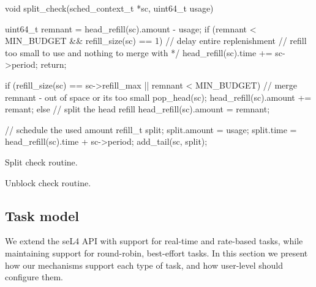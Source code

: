 \begin{listing}
    \begin{ccode}
void split_check(sched_context_t *sc, uint64_t usage) {
  uint64_t remnant = head_refill(sc).amount - usage;
  if (remnant < MIN_BUDGET && refill_size(sc) == 1) {
    // delay entire replenishment
    // refill too small to use and nothing to merge with */
    head_refill(sc).time += sc->period;
    return;
  }

  if (refill_size(sc) == sc->refill_max || remnant < MIN_BUDGET) {
    // merge remnant - out of space or its too small
    pop_head(sc);
    head_refill(sc).amount += remant;
  } else {
    // split the head refill
    head_refill(sc).amount = remnant;
  }

  // schedule the used amount
  refill_t split;
  split.amount = usage;
  split.time = head_refill(sc).time + sc->period;
  add_tail(sc, split);
}
\end{ccode}
\caption{Split check routine.}
\label{list:split-check}
\end{listing}

\begin{listing}
    \begin{ccode}
void unblock_check(sched_context_t *sc) {
  if (!head_refill(sc).time > now)) {
    return;
  }

  head_refill(sc).time = now;
  // merge available replenishments
  while (refill_size(sc) > 1) {
    if (refill_next(sc).time < now + head_refill(sc).amount) {
      refill_t old_head = pop_head(sc);
      head_refill(sc).amount += old_head.amount;
      head_refill(sc).time = now;
    } else {
      break;
    }

    if (head_refill(sc).amount < MIN_BUDGET) {
      // second part of split_check can leave refills
      // with less than MIN_BUDGET amount.
      // detect them here and merge.
      refill_t old_head = pop_head(sc);
      head_refill(sc).amount += old_head.amount;
    }
}
\end{ccode}
\caption{Unblock check routine.}
\label{list:unblock-check}
\end{listing}

\subsection{Task model}

We extend the seL4 API with support for real-time and rate-based tasks, while maintaining support for round-robin, best-effort tasks.
In this section we present how our mechanisms support each type of task, and how user-level should configure them.

